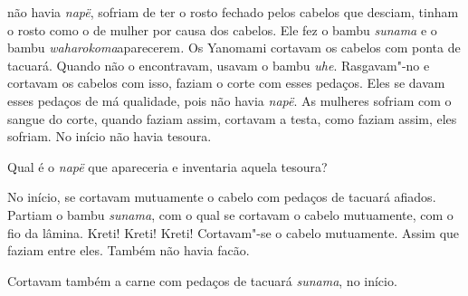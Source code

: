  

 não havia \emph{napë}, sofriam de ter o rosto fechado pelos
cabelos que desciam, tinham o rosto como o de mulher por causa dos
cabelos. Ele fez o bambu \emph{sunama} e o
bambu \emph{waharokoma}aparecerem\emph{.} Os Yanomami cortavam os
cabelos com ponta de tacuará. Quando não o encontravam, usavam o
bambu \emph{uhe}. Rasgavam"-no e cortavam os cabelos com isso, faziam o
corte com esses pedaços. Eles se davam esses pedaços de má qualidade,
pois não havia \emph{napë}. As mulheres sofriam com o sangue do corte,
quando faziam assim, cortavam a testa, como faziam assim, eles sofriam.
No início não havia tesoura. 

Qual é o \emph{napë} que apareceria e inventaria aquela tesoura?

No início, se cortavam mutuamente o cabelo com pedaços de tacuará
afiados. Partiam o bambu \emph{sunama}, com o qual se cortavam o cabelo
mutuamente, com o fio da lâmina. Kreti! Kreti! Kreti! Cortavam"-se o
cabelo mutuamente. Assim que faziam entre eles. Também não havia facão. 

Cortavam também a carne com pedaços de tacuará \emph{sunama}, no início.

 

